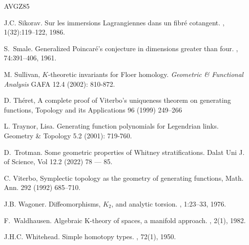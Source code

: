 \documentclass{amsart}
\theoremstyle{definition}
\theoremstyle{remark}
\newtheorem{inductive lemma}[theorem]{Inductive Lemma}
\begin{document}
\begin{thebibliography}{AVGZ85}









J.C. Sikorav.
\newblock Sur les immersions Lagrangiennes dans un fibr\'e cotangent.
, 1(32):119--122,
  1986.
  
  
  

S.~Smale.
\newblock Generalized Poincaré's conjecture in dimensions greater than four.
, 74:391--406, 1961.

 M. Sullivan, $K$-theoretic invariants for Floer homology. {\em Geometric \& Functional Analysis} GAFA 12.4 (2002): 810-872.



 D. Th\'eret, A complete proof of Viterbo’s uniqueness theorem on generating functions, Topology and its Applications 96 (1999) 249–266

L. Traynor, Lisa. 
\newblock Generating function polynomials for Legendrian links.
\newblock Geometry \& Topology 5.2 (2001): 719-760.


D.~Trotman.
\newblock Some geometric properties of Whitney stratifications.
\newblock Dalat Uni J. of Science, Vol 12.2 (2022) 78 — 85.


  C. Viterbo, Symplectic topology as the geometry of generating functions, Math. Ann. 292
(1992) 685–710.






J.B. Wagoner.
\newblock Diffeomorphisms, $K_2$, and analytic torsion.
, 1:23--33, 1976.

F.~Waldhausen.
\newblock Algebraic K-theory of spaces, a manifold approach.
, 2(1),
  1982.

J.H.C. Whitehead.
\newblock Simple homotopy types.
, 72(1), 1950.

\end{thebibliography}
\end{document}
